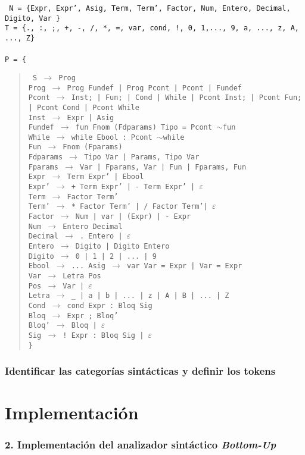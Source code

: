 \documentclass[12pt]{article}
\begin{document}
\noindent
\noindent
\texttt{
  \noindent
N = \{Expr, Expr', Asig, Term, Term', Factor, Num, Entero, Decimal, Digito, Var \}\\
T = \{., :, ;, +, -, /, *, =, var, cond, !, 0, 1,..., 9, a, ..., z, A, ..., Z\}\\ \\ 
P = \{}
\begin{quote}
  \texttt{
    S $\to$ Prog\\
    Prog $\to$ Prog Fundef | Prog Pcont | Pcont | Fundef\\
    Pcont $\to$ Inst; | Fun; | Cond | While | Pcont Inst; | Pcont Fun; | Pcont Cond | Pcont While\\
    Inst $\to$ Expr | Asig\\
    Fundef $\to$ fun Fnom (Fdparams) Tipo = Pcont $\sim$fun\\
    While $\to$ while Ebool : Pcont $\sim$while\\    
    Fun $\to$ Fnom (Fparams)\\
    Fdparams $\to$ Tipo Var | Params, Tipo Var\\
    Fparams $\to$ Var | Fparams, Var | Fun | Fparams, Fun\\
    Expr  $\to$ Term Expr' | Ebool \\
    Expr' $\to$ + Term Expr' | - Term Expr' | $\varepsilon$ \\
    Term  $\to$ Factor Term' \\
    Term' $\to$ * Factor Term' | / Factor Term'| $\varepsilon$ \\
    Factor $\to$ Num | var | (Expr) | - Expr \\
    Num $\to$ Entero Decimal \\
    Decimal $\to$ . Entero | $\varepsilon$ \\
    Entero $\to$ Digito | Digito Entero \\
    Digito $\to$ 0 | 1 | 2 | ... | 9 \\
    Ebool $\to$ ...
    Asig $\to$ var Var = Expr | Var = Expr \\
    Var  $\to$ Letra Pos \\
    Pos  $\to$ Var | $\varepsilon$ \\
    Letra $\to$ \_ | a | b | ... | z | A | B | ... | Z \\
    Cond $\to$ cond Expr : Bloq Sig \\
    Bloq $\to$ Expr ; Bloq'\\
    Bloq' $\to$ Bloq | $\varepsilon$\\ 
    Sig $\to$ ! Expr : Bloq Sig | $\varepsilon$ \\ 
    \}
}
 
\end{quote}

\subsubsection*{Identificar las categorías sintácticas y definir los tokens}

\section{Implementación}
\subsubsection*{2. Implementación del analizador sintáctico \textit{Bottom-Up}}
\end{document}
